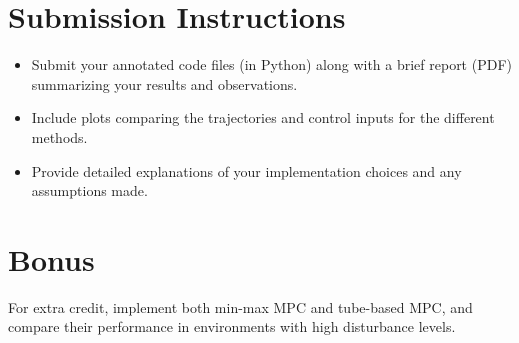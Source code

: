 \documentclass[11pt]{article}
\begin{document}
\section{Submission Instructions}
\begin{itemize}
    \item Submit your annotated code files (in Python) along with a brief report (PDF) summarizing your results and observations.
    \item Include plots comparing the trajectories and control inputs for the different methods.
    \item Provide detailed explanations of your implementation choices and any assumptions made.
\end{itemize}

\section{Bonus}
For extra credit, implement both min-max MPC and tube-based MPC, and compare their performance in environments with high disturbance levels.
\end{document}
